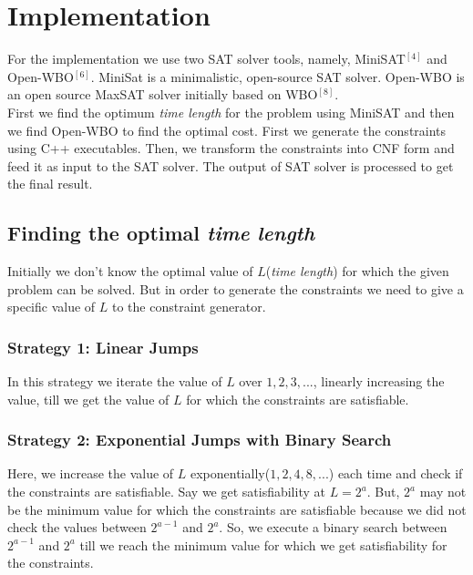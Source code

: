 \documentclass{article}[11pt]
\begin{document}
	\section{Implementation}
		For the implementation we use two SAT solver tools, namely, MiniSAT$^[4]$ and Open-WBO$^[6]$. MiniSat is a minimalistic, open-source SAT solver. Open-WBO is an open source MaxSAT solver initially based on WBO$^{[8]}$.\\
		First we find the optimum \textit{time length} for the problem using MiniSAT and then we find Open-WBO to find the optimal cost.
		First we generate the constraints using C++ executables.
		Then, we transform the constraints into CNF form and feed it as input to the SAT solver.
		The output of SAT solver is processed to get the final result.
		
		\subsection{Finding the optimal \textit{time length}}
			Initially we don't know the optimal value of $L$(\textit{time length}) for which the given problem can be solved. But in order to generate the constraints we need to give a specific value of $L$ to the constraint generator.

			\subsubsection{Strategy 1: Linear Jumps}
			In this strategy we iterate the value of $L$ over $1, 2, 3, ...$, linearly increasing the value, till we get the value of $L$ for which the constraints are satisfiable.\\
			
			\subsubsection{Strategy 2: Exponential Jumps with Binary Search}
			Here, we increase the value of $L$ exponentially($1, 2, 4, 8, ...$) each time and check if the constraints are satisfiable. Say we get satisfiability at $L = 2^a$. But, $2^a$ may not be the minimum value for which the constraints are satisfiable because we did not check the values between $2^{a-1}$ and $2^a$. So, we execute a binary search between $2^{a-1}$ and $2^a$ till we reach the minimum value for which we get satisfiability for the constraints.
\end{document}
